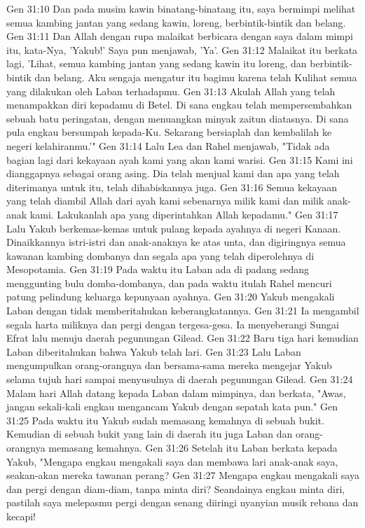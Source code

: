 Gen 31:10  Dan pada musim kawin binatang-binatang itu, saya bermimpi melihat semua kambing jantan yang sedang kawin, loreng, berbintik-bintik dan belang.
Gen 31:11  Dan Allah dengan rupa malaikat berbicara dengan saya dalam mimpi itu, kata-Nya, 'Yakub!' Saya pun menjawab, 'Ya'.
Gen 31:12  Malaikat itu berkata lagi, 'Lihat, semua kambing jantan yang sedang kawin itu loreng, dan berbintik-bintik dan belang. Aku sengaja mengatur itu bagimu karena telah Kulihat semua yang dilakukan oleh Laban terhadapmu.
Gen 31:13  Akulah Allah yang telah menampakkan diri kepadamu di Betel. Di sana engkau telah mempersembahkan sebuah batu peringatan, dengan menuangkan minyak zaitun diatasnya. Di sana pula engkau bersumpah kepada-Ku. Sekarang bersiaplah dan kembalilah ke negeri kelahiranmu.'"
Gen 31:14  Lalu Lea dan Rahel menjawab, "Tidak ada bagian lagi dari kekayaan ayah kami yang akan kami warisi.
Gen 31:15  Kami ini dianggapnya sebagai orang asing. Dia telah menjual kami dan apa yang telah diterimanya untuk itu, telah dihabiskannya juga.
Gen 31:16  Semua kekayaan yang telah diambil Allah dari ayah kami sebenarnya milik kami dan milik anak-anak kami. Lakukanlah apa yang diperintahkan Allah kepadamu."
Gen 31:17  Lalu Yakub berkemas-kemas untuk pulang kepada ayahnya di negeri Kanaan. Dinaikkannya istri-istri dan anak-anaknya ke atas unta, dan digiringnya semua kawanan kambing dombanya dan segala apa yang telah diperolehnya di Mesopotamia.
Gen 31:19  Pada waktu itu Laban ada di padang sedang menggunting bulu domba-dombanya, dan pada waktu itulah Rahel mencuri patung pelindung keluarga kepunyaan ayahnya.
Gen 31:20  Yakub mengakali Laban dengan tidak memberitahukan keberangkatannya.
Gen 31:21  Ia mengambil segala harta miliknya dan pergi dengan tergesa-gesa. Ia menyeberangi Sungai Efrat lalu menuju daerah pegunungan Gilead.
Gen 31:22  Baru tiga hari kemudian Laban diberitahukan bahwa Yakub telah lari.
Gen 31:23  Lalu Laban mengumpulkan orang-orangnya dan bersama-sama mereka mengejar Yakub selama tujuh hari sampai menyusulnya di daerah pegunungan Gilead.
Gen 31:24  Malam hari Allah datang kepada Laban dalam mimpinya, dan berkata, "Awas, jangan sekali-kali engkau mengancam Yakub dengan sepatah kata pun."
Gen 31:25  Pada waktu itu Yakub sudah memasang kemahnya di sebuah bukit. Kemudian di sebuah bukit yang lain di daerah itu juga Laban dan orang-orangnya memasang kemahnya.
Gen 31:26  Setelah itu Laban berkata kepada Yakub, "Mengapa engkau mengakali saya dan membawa lari anak-anak saya, seakan-akan mereka tawanan perang?
Gen 31:27  Mengapa engkau mengakali saya dan pergi dengan diam-diam, tanpa minta diri? Seandainya engkau minta diri, pastilah saya melepasmu pergi dengan senang diiringi nyanyian musik rebana dan kecapi!
